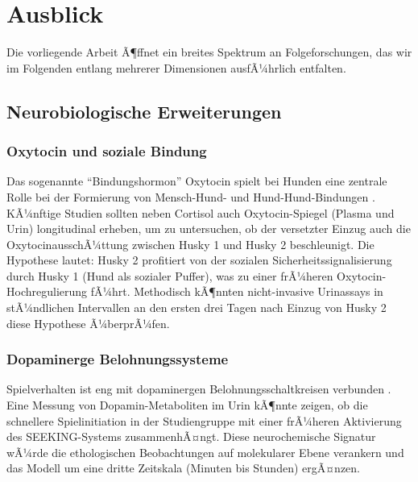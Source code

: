 ﻿\documentclass[12pt, a4paper]{article}
\theoremstyle{plain}
\theoremstyle{definition}
\theoremstyle{remark}
\begin{document}
\section{Ausblick}
\label{sec:ausblick}

Die vorliegende Arbeit Ã¶ffnet ein breites Spektrum an Folgeforschungen, das
wir im Folgenden entlang mehrerer Dimensionen ausfÃ¼hrlich entfalten.

\subsection{Neurobiologische Erweiterungen}

\subsubsection{Oxytocin und soziale Bindung}

Das sogenannte ``Bindungshormon'' Oxytocin spielt bei Hunden eine zentrale
Rolle bei der Formierung von Mensch-Hund- und Hund-Hund-Bindungen
\cite{nagasawa2015social}. KÃ¼nftige Studien sollten neben Cortisol auch
Oxytocin-Spiegel (Plasma und Urin) longitudinal erheben, um zu untersuchen,
ob der versetzter Einzug auch die OxytocinausschÃ¼ttung zwischen Husky 1 und
Husky 2 beschleunigt. Die Hypothese lautet: Husky 2 profitiert von der
sozialen Sicherheitssignalisierung durch Husky 1 (Hund als sozialer Puffer),
was zu einer frÃ¼heren Oxytocin-Hochregulierung fÃ¼hrt. Methodisch kÃ¶nnten
nicht-invasive Urinassays in stÃ¼ndlichen Intervallen an den ersten drei Tagen
nach Einzug von Husky 2 diese Hypothese Ã¼berprÃ¼fen.

\subsubsection{Dopaminerge Belohnungssysteme}

Spielverhalten ist eng mit dopaminergen Belohnungsschaltkreisen verbunden
\cite{panksepp1998affective}. Eine Messung von Dopamin-Metaboliten im
Urin kÃ¶nnte zeigen, ob die schnellere Spielinitiation in der Studiengruppe
mit einer frÃ¼heren Aktivierung des SEEKING-Systems zusammenhÃ¤ngt. Diese
neurochemische Signatur wÃ¼rde die ethologischen Beobachtungen auf molekularer
Ebene verankern und das Modell um eine dritte Zeitskala (Minuten bis Stunden)
ergÃ¤nzen.
\end{document}
